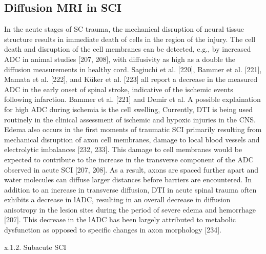 \subsection{Diffusion MRI in SCI}
In the acute stages of SC trauma, the mechanical disruption of neural tissue structure results in immediate death of cells in the region of the injury. The cell death and disruption of the cell membranes can be detected, e.g., by increased ADC in animal studies [207, 208], with diffusivity as high as a double the diffusion measurements in healthy cord. Sagiuchi et al. [220], Bammer et al. [221], Mamata et al. [222], and Küker et al. [223] all report a decrease in the measured ADC in the early onset of spinal stroke, indicative of the ischemic events following infarction.  Bammer et al. [221] and Demir et al. A possible explaination for high ADC during ischemia is the cell swelling, Currently, DTI is being used routinely in the clinical assessment of ischemic and hypoxic injuries in the CNS. Edema also occurs in the first moments of traumatic SCI primarily resulting from mechanical disruption of axon cell membranes, damage to local blood vessels and electrolytic imbalances [232, 233].  This damage to cell membranes would be expected to contribute to the increase in the transverse component of the ADC observed in acute SCI [207, 208]. As a result, axons are spaced further apart and water molecules can diffuse larger distances before barriers are encountered. In addition to an increase in transverse diffusion, DTI in acute spinal trauma often exhibits a decrease in lADC, resulting in an overall decrease in diffusion anisotropy in the lesion sites during the period of severe edema and hemorrhage [207].  This decrease in the lADC has been largely attributed to metabolic dysfunction as opposed to specific changes in axon morphology [234]. 

x.1.2. Subacute SCI

